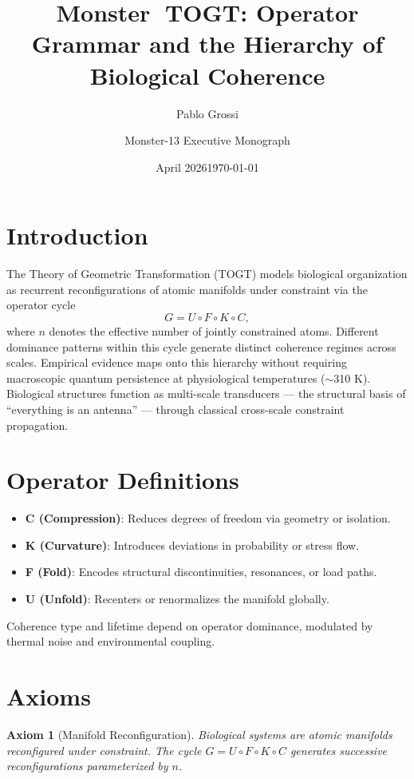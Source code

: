 \documentclass{article}
\title{Monster 👹}
\author{Pablo Grossi}
\date{April 2026}
\title{TOGT: Operator Grammar and the Hierarchy of Biological Coherence}
\author{Monster-13 Executive Monograph}
\date{\today}
\newtheorem{axiom}{Axiom}
\begin{document}
\maketitle

\section{Introduction}

The Theory of Geometric Transformation (TOGT) models biological organization as recurrent reconfigurations of atomic manifolds under constraint via the operator cycle
\[
G = U \circ F \circ K \circ C,
\]
where \(n\) denotes the effective number of jointly constrained atoms. Different dominance patterns within this cycle generate distinct coherence regimes across scales. Empirical evidence maps onto this hierarchy without requiring macroscopic quantum persistence at physiological temperatures ($\sim$310 K). Biological structures function as multi-scale transducers — the structural basis of “everything is an antenna” — through classical cross-scale constraint propagation.

\section{Operator Definitions}

\begin{itemize}
\item \textbf{C (Compression)}: Reduces degrees of freedom via geometry or isolation.
\item \textbf{K (Curvature)}: Introduces deviations in probability or stress flow.
\item \textbf{F (Fold)}: Encodes structural discontinuities, resonances, or load paths.
\item \textbf{U (Unfold)}: Recenters or renormalizes the manifold globally.
\end{itemize}

Coherence type and lifetime depend on operator dominance, modulated by thermal noise and environmental coupling.

\section{Axioms}

\begin{axiom}[Manifold Reconfiguration]
Biological systems are atomic manifolds reconfigured under constraint. The cycle \(G = U \circ F \circ K \circ C\) generates successive reconfigurations parameterized by \(n\).
\end{axiom}
\end{document}
